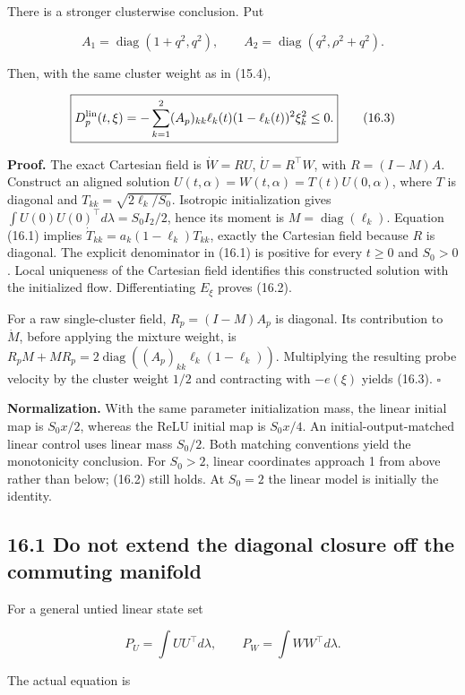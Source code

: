 \documentclass[
  10pt,
]{article}
\begin{document}
There is a stronger clusterwise conclusion. Put

\[
 A_1=\operatorname{diag}(1+q^2,q^2),\qquad
 A_2=\operatorname{diag}(q^2,\rho^2+q^2).
\]

Then, with the same cluster weight as in (15.4),

\[
 \boxed{D_p^{\rm lin}(t,\xi)
 =-\sum_{k=1}^2(A_p)_{kk}\ell_k(t)(1-\ell_k(t))^2\xi_k^2\le0.}
 \tag{16.3}
\]

\textbf{Proof.} The exact Cartesian field is \(\dot W=RU\),
\(\dot U=R^\top W\), with \(R=(I-M)A\). Construct an aligned solution
\(U(t,\alpha)=W(t,\alpha)=T(t)U(0,\alpha)\), where \(T\) is diagonal and
\(T_{kk}=\sqrt{2\ell_k/S_0}\). Isotropic initialization gives
\(\int U(0)U(0)^\top d\lambda=S_0I_2/2\), hence its moment is
\(M=\operatorname{diag}(\ell_k)\). Equation (16.1) implies
\(\dot T_{kk}=a_k(1-\ell_k)T_{kk}\), exactly the Cartesian field because
\(R\) is diagonal. The explicit denominator in (16.1) is positive for
every \(t\ge0\) and \(S_0>0\). Local uniqueness of the Cartesian field
identifies this constructed solution with the initialized flow.
Differentiating \(E_\xi\) proves (16.2).

For a raw single-cluster field, \(R_p=(I-M)A_p\) is diagonal. Its
contribution to \(\dot M\), before applying the mixture weight, is
\(R_pM+MR_p=2\operatorname{diag}((A_p)_{kk}\ell_k(1-\ell_k))\).
Multiplying the resulting probe velocity by the cluster weight \(1/2\)
and contracting with \(-e(\xi)\) yields (16.3). \(\square\)

\textbf{Normalization.} With the same parameter initialization mass, the
linear initial map is \(S_0x/2\), whereas the ReLU initial map is
\(S_0x/4\). An initial-output-matched linear control uses linear mass
\(S_0/2\). Both matching conventions yield the monotonicity conclusion.
For \(S_0>2\), linear coordinates approach 1 from above rather than
below; (16.2) still holds. At \(S_0=2\) the linear model is initially
the identity.

\subsection{16.1 Do not extend the diagonal closure off the commuting
manifold}\label{do-not-extend-the-diagonal-closure-off-the-commuting-manifold}

For a general untied linear state set

\[
 P_U=\int UU^\top d\lambda,\qquad P_W=\int WW^\top d\lambda.
\]

The actual equation is
\end{document}
